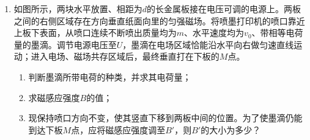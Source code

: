 \documentclass[\gkver]{gaokaozhenti}
\begin{document}
\begin{enumerate}
{（2）“A 鱼”在水中运动时受重力、浮力和阻力的作用，做匀减速运动，设加速度为 $a_{A}$，有 $F_{\text{合}}=F_{\text{浮}}+f_{A}-mg$，$F_{\text{合}}=ma_{A}$，$0-v_{A1}^{2}=-2a_{A}h_{A}$，由题意 $F_{\text{浮}}=\frac{10}{9}mg$。综合上述各式，得 $f_{A}=mg\left(\frac{H}{h_{A}}-\frac{1}{9}\right)$。

（3）考虑到“B 鱼”的受力、运动情况与“A 鱼”相似，有 $f_{B}=mg\left(\frac{H}{h_{B}}-\frac{1}{9}\right)$，解得 $\frac{f_{A}}{f_{B}}=\frac{h_{B}(9H-h_{A})}{h_{A}(9H-h_{B})}$。
}

\item
如图所示，两块水平放置、相距为$d$的长金属板接在电压可调的电源上。两板之间的右侧区域存在方向垂直纸面向里的匀强磁场。将喷墨打印机的喷口靠近上板下表面，从喷口连续不断喷出质量均为$m$、水平速度均为$v_{0}$、带相等电荷量的墨滴。调节电源电压至$U$，墨滴在电场区域恰能沿水平向右做匀速直线运动；进入电场、磁场共存区域后，最终垂直打在下板的$M$点。
\begin{enumerate}
	\item
	判断墨滴所带电荷的种类，并求其电荷量；
	\item
	求磁感应强度$B$的值；
	\item
	现保持喷口方向不变，使其竖直下移到两板中间的位置。为了使墨滴仍能到达下板$M$点，应将磁感应强度调至$B'$，则$B'$的大小为多少？
\end{enumerate}
\end{enumerate}
\end{document}
